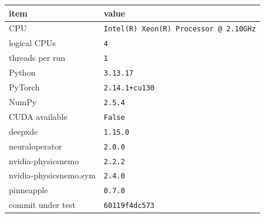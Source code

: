 \begin{tabular}{ll}
\toprule
item & value \\
\midrule
CPU & \texttt{Intel(R) Xeon(R) Processor @ 2.10GHz} \\
logical CPUs & \texttt{4} \\
threads per run & \texttt{1} \\
Python & \texttt{3.13.17} \\
PyTorch & \texttt{2.14.1+cu130} \\
NumPy & \texttt{2.5.4} \\
CUDA available & \texttt{False} \\
deepxde & \texttt{1.15.0} \\
neuraloperator & \texttt{2.0.0} \\
nvidia-physicsnemo & \texttt{2.2.2} \\
nvidia-physicsnemo.sym & \texttt{2.4.0} \\
pinneapple & \texttt{0.7.0} \\
commit under test & \texttt{60119f4dc573} \\
\bottomrule
\end{tabular}

